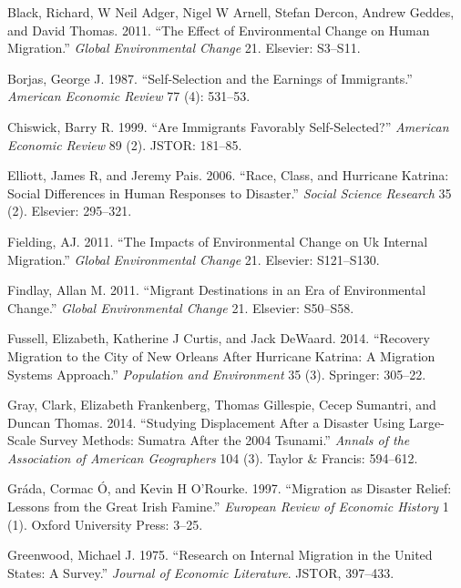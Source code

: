 \documentclass[]{article}
\begin{document}
\hypertarget{refs}{}
\hypertarget{ref-black2011effect}{}
Black, Richard, W Neil Adger, Nigel W Arnell, Stefan Dercon, Andrew
Geddes, and David Thomas. 2011. ``The Effect of Environmental Change on
Human Migration.'' \emph{Global Environmental Change} 21. Elsevier:
S3--S11.

\hypertarget{ref-borjas1987self}{}
Borjas, George J. 1987. ``Self-Selection and the Earnings of
Immigrants.'' \emph{American Economic Review} 77 (4): 531--53.

\hypertarget{ref-chiswick1999immigrants}{}
Chiswick, Barry R. 1999. ``Are Immigrants Favorably Self-Selected?''
\emph{American Economic Review} 89 (2). JSTOR: 181--85.

\hypertarget{ref-elliott2006race}{}
Elliott, James R, and Jeremy Pais. 2006. ``Race, Class, and Hurricane
Katrina: Social Differences in Human Responses to Disaster.''
\emph{Social Science Research} 35 (2). Elsevier: 295--321.

\hypertarget{ref-fielding2011impacts}{}
Fielding, AJ. 2011. ``The Impacts of Environmental Change on Uk Internal
Migration.'' \emph{Global Environmental Change} 21. Elsevier:
S121--S130.

\hypertarget{ref-findlay2011migrant}{}
Findlay, Allan M. 2011. ``Migrant Destinations in an Era of
Environmental Change.'' \emph{Global Environmental Change} 21. Elsevier:
S50--S58.

\hypertarget{ref-fussell2014recovery}{}
Fussell, Elizabeth, Katherine J Curtis, and Jack DeWaard. 2014.
``Recovery Migration to the City of New Orleans After Hurricane Katrina:
A Migration Systems Approach.'' \emph{Population and Environment} 35
(3). Springer: 305--22.

\hypertarget{ref-gray2014studying}{}
Gray, Clark, Elizabeth Frankenberg, Thomas Gillespie, Cecep Sumantri,
and Duncan Thomas. 2014. ``Studying Displacement After a Disaster Using
Large-Scale Survey Methods: Sumatra After the 2004 Tsunami.''
\emph{Annals of the Association of American Geographers} 104 (3). Taylor
\& Francis: 594--612.

\hypertarget{ref-grada1997migration}{}
Gráda, Cormac Ó, and Kevin H O'Rourke. 1997. ``Migration as Disaster
Relief: Lessons from the Great Irish Famine.'' \emph{European Review of
Economic History} 1 (1). Oxford University Press: 3--25.

\hypertarget{ref-greenwood1975research}{}
Greenwood, Michael J. 1975. ``Research on Internal Migration in the
United States: A Survey.'' \emph{Journal of Economic Literature}. JSTOR,
397--433.
\end{document}
